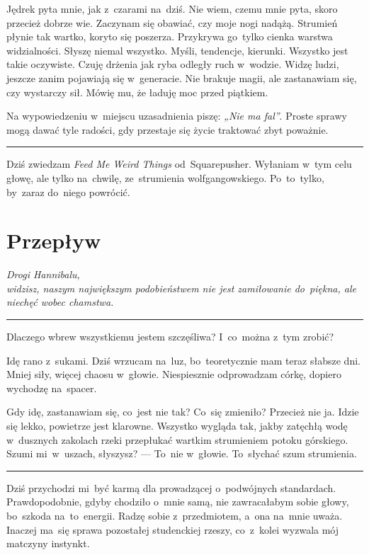 \documentclass[9pt, a5paper]{memoir}
\begin{document}
Jędrek pyta mnie, jak z~czarami na~dziś. Nie wiem, czemu mnie pyta, skoro przecież dobrze wie. Zaczynam się obawiać, czy moje nogi nadążą. Strumień płynie tak wartko, koryto się poszerza. Przykrywa go~tylko cienka warstwa widzialności. Słyszę niemal wszystko. Myśli, tendencje, kierunki. Wszystko jest takie oczywiste. Czuję drżenia jak ryba odległy ruch w~wodzie. Widzę ludzi, jeszcze zanim pojawiają się w~generacie. Nie brakuje magii, ale zastanawiam się, czy wystarczy sił. Mówię mu, że ładuję moc przed piątkiem.

Na wypowiedzeniu w~miejscu uzasadnienia piszę: \textit{„Nie ma fal”}. Proste sprawy mogą dawać tyle radości, gdy przestaje się życie traktować zbyt poważnie.

\fancybreak{* \quad * \quad *}

Dziś zwiedzam \textit{Feed Me Weird Things} od~Squarepusher. Wyłaniam w~tym celu głowę, ale tylko na~chwilę, ze~strumienia wolfgangowskiego. Po~to~tylko, by~zaraz do~niego powrócić.


\newpage
\section{Przepływ}
{
\itshape
Drogi Hannibalu,\\
widzisz, naszym największym podobieństwem nie jest zamiłowanie do~piękna, ale niechęć wobec chamstwa.
}

\fancybreak{* \quad * \quad *}

Dlaczego wbrew wszystkiemu jestem szczęśliwa? I~co~można z~tym zrobić?

Idę rano z~sukami. Dziś wrzucam na~luz, bo~teoretycznie mam teraz słabsze dni. Mniej siły, więcej chaosu w~głowie. Niespiesznie odprowadzam córkę, dopiero wychodzę na~spacer.

Gdy idę, zastanawiam się, co~jest nie tak? Co~się zmieniło? Przecież nie ja. Idzie się lekko, powietrze jest klarowne. Wszystko wygląda tak, jakby zatęchłą wodę w~dusznych zakolach rzeki przepłukać wartkim strumieniem potoku górskiego. Szumi mi~w~uszach, słyszysz? --- To~nie w~głowie. To~słychać szum strumienia.

\fancybreak{* \quad * \quad *}

Dziś przychodzi mi~być karmą dla prowadzącej o~podwójnych standardach. Prawdopodobnie, gdyby chodziło o~mnie samą, nie zawracałabym sobie głowy, bo~szkoda na~to~energii. Radzę sobie z~przedmiotem, a~ona na~mnie uważa. Inaczej ma~się sprawa pozostałej studenckiej rzeszy, co~z~kolei wyzwala mój matczyny instynkt.
\end{document}
